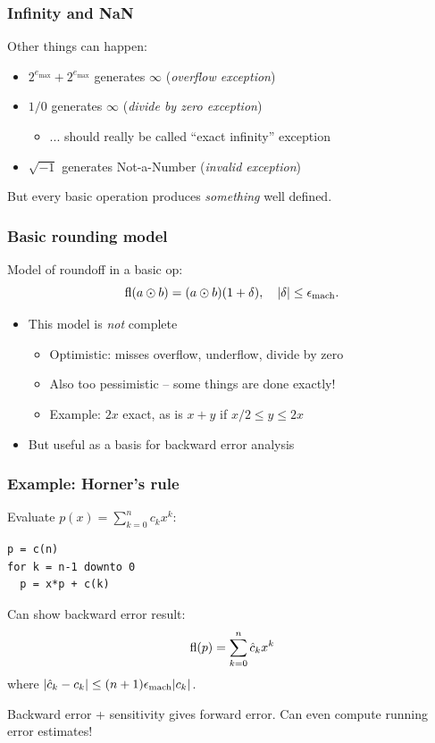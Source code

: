 \documentclass{beamer}
\begin{document}
\begin{frame}
  \frametitle{Infinity and NaN}

  Other things can happen:
  \begin{itemize}
  \item $2^{e_{\max}} + 2^{e_{\max}}$ generates $\infty$ ({\em overflow exception})
  \item $1/0$ generates $\infty$ ({\em divide by zero exception})
    \begin{itemize}
    \item ... should really be called ``exact infinity'' exception
    \end{itemize}
  \item $\sqrt{-1}$ generates Not-a-Number ({\em invalid exception})
  \end{itemize}
  But every basic operation produces {\em something} well defined.
\end{frame}


\begin{frame}
  \frametitle{Basic rounding model}

  Model of roundoff in a basic op:
  \[
    \operatorname{fl}(a \odot b) = (a \odot b)(1 + \delta), \quad
    |\delta| \leq \epsilon_{\mathrm{mach}}.
  \]
  \begin{itemize}
  \item This model is {\em not} complete
    \begin{itemize}
    \item Optimistic: misses overflow, underflow, divide by zero
    \item Also too pessimistic -- some things are done exactly!
    \item Example: $2x$ exact, as is $x+y$ if $x/2 \leq y \leq 2x$
    \end{itemize}
  \item But useful as a basis for backward error analysis
  \end{itemize}
\end{frame}


\begin{frame}[fragile]
  \frametitle{Example: Horner's rule}

Evaluate $p(x) = \sum_{k=0}^n c_k x^k$:
\begin{lstlisting}
p = c(n)
for k = n-1 downto 0
  p = x*p + c(k)
\end{lstlisting}

\vspace{5mm}
Can show backward error result:
\[
  \operatorname{fl}(p) = \sum_{k=0}^n \hat{c}_k x^k
\]
where $|\hat{c}_k-c_k| \leq (n+1) \epsilon_{\mathrm{mach}} |c_k|$.

\vspace{5mm}
Backward error + sensitivity gives forward error.  Can even
compute running error estimates!

\end{frame}
\end{document}
